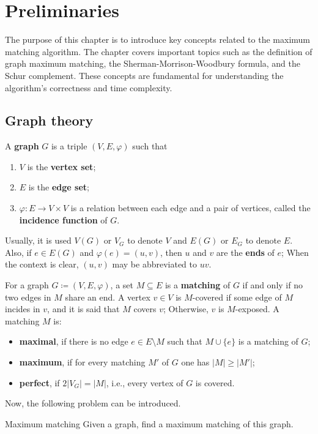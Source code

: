 \renewcommand*{\proofname}{Proof}

\chapter{Preliminaries}

The purpose of this chapter is to introduce key concepts related to the maximum matching algorithm. 
The chapter covers important topics such as the definition of graph maximum matching, the Sherman-Morrison-Woodbury formula, and the Schur complement. 
These concepts are fundamental for understanding the algorithm's correctness and time complexity.

\enlargethispage{.5\baselineskip}

\section{Graph theory}
\label{sec:graph}

\begin{definition}[Graph]
	\label{def:graph}
	A \textbf{graph} \(G\) is a triple \((V, E, \varphi)\) such that
	\begin{enumerate}[label=(\roman*)]
		\item \(V\) is the \textbf{vertex set};
		\item \(E\) is the \textbf{edge set};
		\item \(\varphi: E \to V \times V\) is a relation between each edge and a pair of vertices, called the \textbf{incidence function} of \(G\).
	\end{enumerate}
	Usually, it is used 
	\(V(G)\) or \(V_G\) to denote \(V\) and 
	\(E(G)\) or \(E_G\) to denote \(E\).
	Also, if \(e \in E(G)\) and \(\varphi(e) = (u, v)\), then \(u\) and \(v\) are the \textbf{ends} of \(e\);
	When the context is clear, \((u, v)\) may be abbreviated to \(uv\).
\end{definition}

\begin{definition}[Matching]
	\label{def:matching}
	For a graph \(G \coloneqq (V, E, \varphi)\), a set \(M \subseteq E\) is a \textbf{matching} of \(G\) if and only if no two edges in \(M\) share an end.
	A vertex \(v \in V\) is \(M\)-covered if some edge of \(M\) incides in \(v\), 
	and it is said that \(M\) covers \(v\);
	Otherwise, \(v\) is \(M\)-exposed.
	A matching \(M\) is:
	\begin{itemize}
		\item 
			\textbf{maximal}, if there is no edge \(e \in E \setminus M\) such that \(M \cup \{e\}\) is a matching of \(G\);

		\item
			\textbf{maximum}, if for every matching \(M'\) of \(G\) one has \(|M| \geq |M'|\);
	
		\item
			\textbf{perfect}, if \(2|V_G| = |M|\), i.e., every vertex of \(G\) is covered.
	\end{itemize}
	Now, the following problem can be introduced.
	\\
\end{definition}
\begin{problem}{Maximum matching}
	Given a graph, find a maximum matching of this graph.
\end{problem}